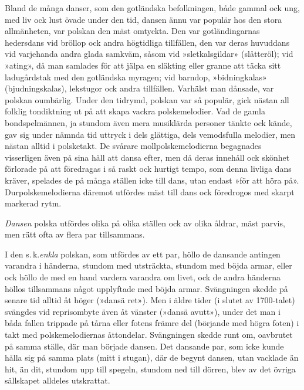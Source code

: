 \pagestyle{empty}
\fancyhfoffset[E,O]{0pt}
\addtolength{\skip\footins}{\baselineskip}
{
\setlength{\parindent}{1.5em}


{\setlength{\parindent}{0mm}
Bland de många danser, som den gotländska befolkningen,
både gammal ock ung, med liv ock lust övade under den
tid, dansen ännu var populär hos den stora allmänheten, var
polskan den mäst omtyckta. Den var gotländingarnas hedersdans vid bröllop ock andra högtidliga tillfällen, den var deras huvuddans vid varjehanda andra glada samkväm, såsom vid »sletkalsgildar» (slåtteröl); vid »ating», då man samlades för att jälpa en släkting eller granne att täcka sitt ladugårdstak med den gotländska myragen; vid barndop, »bidningkalas»
(bjudningskalas), lekstugor ock andra tillfällen. Varhälst man dånsade, var polskan oumbärlig. Under den tidrymd, polskan var så populär, gick nästan all folklig tondiktning ut på att skapa vackra polskemelodier. Vad de gamla bondspelmännen, ja stundom även mera musiklärda personer tänkte ock kände, gav sig under nämnda tid uttryck i dels glättiga, dels vemodsfulla melodier, men nästan alltid i \textemdash{} polsketakt. De svårare mollpolskemelodierna begagnades visserligen även på sina håll att dansa efter, men då deras innehåll ock skönhet förlorade på att föredragas i så raskt ock hurtigt tempo, som denna livliga dans kräver, spelades de på många ställen icke till
dans, utan endast »för att höra på». Durpolskemelodierna däremot utfördes mäst till dans ock föredrogos med skarpt markerad rytm.
}

\textit{Dansen} polska utfördes olika på olika ställen ock av olika åldrar, mäst parvis, men rätt ofta av flera par tillsammans.

I den s.\,k.\@ \textit{enkla} polskan, som utfördes av ett par, höllo de dansande antingen varandra i händerna, stundom med 
utsträckta, %
stundom med böjda armar, eller ock höllo de med en hand vardera varandra om livet, ock de andra händerna höllos tillsammans något upplyftade med böjda armar. Svängningen skedde på senare tid alltid åt höger (»dansä ret»). Men i äldre tider (i slutet av 1700-talet) svängdes vid reprisombyte även åt vänster (»dansä avutt»), under det man i båda fallen trippade på tårna eller fotens främre del (börjande med högra foten) i takt med polskemelodiernas åttondelar. Svängningen skedde runt om, oavbrutet på samma ställe, där man började dansen. Det dansande par, som icke kunde hålla sig på samma plats (mitt i stugan), där de begynt dansen, utan vacklade än hit, än dit, stundom upp till spegeln, stundom ned till dörren, blev av det övriga sällskapet alldeles utskrattat.

}
